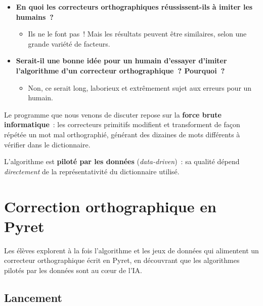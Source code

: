 \documentclass[12pt,a4paper]{article}
\begin{document}
\begin{itemize}
  \item \textbf{En quoi les correcteurs orthographiques réussissent-ils à imiter les humains~?}
  \begin{itemize}
    \item Ils ne le font pas~! Mais les résultats peuvent être similaires, selon une grande variété de facteurs.
  \end{itemize}
  \item \textbf{Serait-il une bonne idée pour un humain d'essayer d'imiter l'algorithme d'un correcteur orthographique~? Pourquoi~?}
  \begin{itemize}
    \item Non, ce serait long, laborieux et extrêmement sujet aux erreurs pour un humain.
  \end{itemize}
\end{itemize}

\begin{keypointbox}
  Le programme que nous venons de discuter repose sur la \textbf{force brute informatique}~: les correcteurs primitifs modifient et transforment de façon répétée un mot mal orthographié, générant des dizaines de mots différents à vérifier dans le dictionnaire.

  L'algorithme est \textbf{piloté par les données} (\emph{data-driven})~: sa qualité dépend \emph{directement} de la représentativité du dictionnaire utilisé.
\end{keypointbox}

\newpage

\section{Correction orthographique en Pyret}

\begin{overviewbox}
  Les élèves explorent à la fois l'algorithme et les jeux de données qui alimentent un correcteur orthographique écrit en Pyret, en découvrant que les algorithmes pilotés par les données sont au cœur de l'IA.
\end{overviewbox}

\subsection{Lancement}
\end{document}
